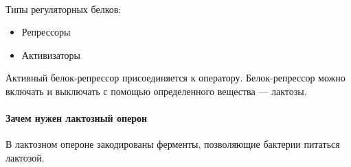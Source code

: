 \documentclass[dvipdfmx]{article}
\begin{document}
\paragraph{}
Типы регуляторных белков:
\begin{itemize}
\item
  Репрессоры
\item
  Активизаторы
\end{itemize}

Активный белок-репрессор присоединяется к оператору.
Белок-репрессор можно включать и выключать с помощью определенного вещества --- лактозы.

\paragraph{Зачем нужен лактозный оперон}

В лактозном опероне закодированы ферменты, позволяющие бактерии питаться лактозой.
\end{document}
